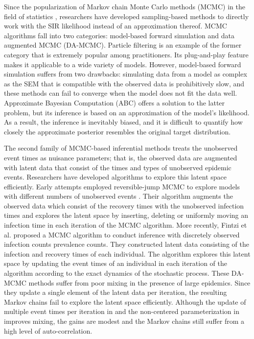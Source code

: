 \documentclass[11pt]{article}
\begin{document}
	Since the popularization of Markov chain Monte Carlo methods (MCMC) in the field of statistics \cite{Tanner.1987, Gelfand.1990, Tierney.1994}, researchers have developed sampling-based methods to directly work with the SIR likelihood instead of an approximation thereof. MCMC algorithms fall into two categories: model-based forward simulation and data augmented MCMC (DA-MCMC).
	Particle filtering \cite{King.2015} is an example of the former category that is extremely popular among practitioners. Its plug-and-play feature makes it applicable to a wide variety of models. However, model-based forward simulation suffers from two drawbacks: simulating data from a model as complex as the SEM that is compatible with the observed data is prohibitively slow, and these methods can fail to converge when the model does not fit the data well. Approximate Bayesian Computation (ABC) \cite{McKinley.2018} offers a solution to the latter problem, but its inference is based on an approximation of the model's likelihood. As a result, the inference is inevitably biased, and it is difficult to quantify how closely the approximate posterior resembles the original target distribution.
	
	The second family of MCMC-based inferential methods treats the unobserved event times as nuisance parameters; that is, the observed data are augmented with latent data that consist of the times and types of unobserved epidemic events. Researchers have developed algorithms to explore this latent space efficiently. Early attempts employed reversible-jump MCMC \cite{Green.1995} to explore models with different numbers of unobserved events \cite{Gibson.1998, ONeill.1999}. Their algorithm augments the observed data which consist of the recovery times with the unobserved infection times and explores the latent space by inserting, deleting or uniformly moving an infection time in each iteration of the MCMC algorithm. 
	More recently, Fintzi et al. \cite{Fintzi.2017} proposed a MCMC algorithm to conduct inference with discretely observed infection counts prevalence counts. They constructed latent data consisting of the infection and recovery times of each individual. The algorithm explores this latent space by updating the event times of an individual in each iteration of the algorithm according to the exact dynamics of the stochastic process. These DA-MCMC methods suffer from poor mixing in the presence of large epidemics. Since they update a single element of the latent data per iteration, the resulting Markov chains fail to explore the latent space efficiently. Although the update of multiple event times per iteration in \cite{Pooley.2015} and the non-centered parameterization in \cite{Neal.2005} improves mixing, the gains are modest and the Markov chains still suffer from a high level of auto-correlation. %
	
\end{document}

